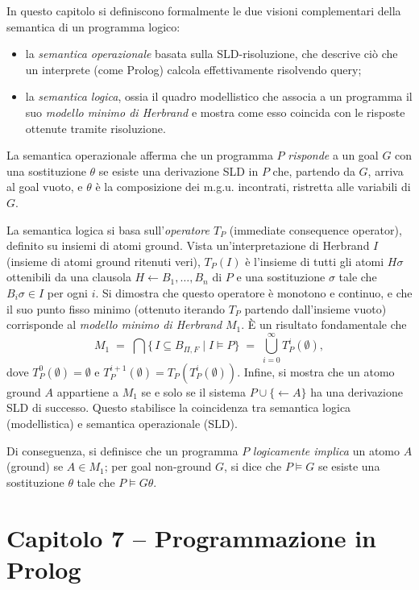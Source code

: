 \documentclass[12pt]{article}
\begin{document}
In questo capitolo si definiscono formalmente le due visioni complementari della semantica di un programma logico: 
\begin{itemize}
  \item la \emph{semantica operazionale} basata sulla SLD-risoluzione, che descrive ciò che un interprete (come Prolog) calcola effettivamente risolvendo query;
  \item la \emph{semantica logica}, ossia il quadro modellistico che associa a un programma il suo \emph{modello minimo di Herbrand} e mostra come esso coincida con le risposte ottenute tramite risoluzione.
\end{itemize}

La semantica operazionale afferma che un programma $P$ \emph{risponde} a un goal $G$ con una sostituzione $\theta$ se esiste una derivazione SLD in $P$ che, partendo da $G$, arriva al goal vuoto, e $\theta$ è la composizione dei m.g.u. incontrati, ristretta alle variabili di $G$.

La semantica logica si basa sull'\emph{operatore $T_P$} (immediate consequence operator), definito su insiemi di atomi ground. Vista un'interpretazione di Herbrand $I$ (insieme di atomi ground ritenuti veri), $T_P(I)$ è l'insieme di tutti gli atomi $H\sigma$ ottenibili da una clausola $H\leftarrow B_1,\dots,B_n$ di $P$ e una sostituzione $\sigma$ tale che $B_i\sigma\in I$ per ogni $i$. Si dimostra che questo operatore è monotono e continuo, e che il suo punto fisso minimo (ottenuto iterando $T_P$ partendo dall'insieme vuoto) corrisponde al \emph{modello minimo di Herbrand} $M_1$. È un risultato fondamentale che
\[
  M_1
  \;=\; \bigcap \{\, I \subseteq B_{\Pi,F} \mid I \models P\}
  \;=\; \bigcup_{i=0}^\infty T_P^i(\emptyset),
\]
dove $T_P^0(\emptyset)=\emptyset$ e $T_P^{i+1}(\emptyset)=T_P(T_P^i(\emptyset))$. Infine, si mostra che un atomo ground $A$ appartiene a $M_1$ se e solo se il sistema $P\cup\{\leftarrow A\}$ ha una derivazione SLD di successo. Questo stabilisce la coincidenza tra semantica logica (modellistica) e semantica operazionale (SLD).

Di conseguenza, si definisce che un programma $P$ \emph{logicamente implica} un atomo $A$ (ground) se $A\in M_1$; per goal non-ground $G$, si dice che $P\models G$ se esiste una sostituzione $\theta$ tale che $P\models G\theta$.

\section*{Capitolo 7 – Programmazione in Prolog}
\end{document}
